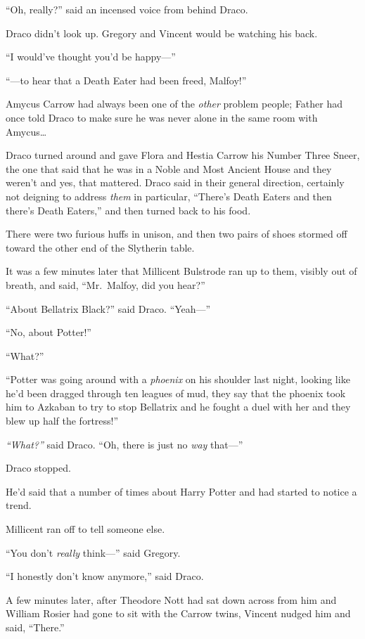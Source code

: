 ``Oh, really?'' said an incensed voice from behind Draco.

Draco didn't look up. Gregory and Vincent would be watching his back.

``I would've thought you'd be happy---''

``---to hear that a Death Eater had been freed, Malfoy!''

Amycus Carrow had always been one of the \emph{other} problem people;
Father had once told Draco to make sure he was never alone in the same
room with Amycus\ldots{}

Draco turned around and gave Flora and Hestia Carrow his Number Three
Sneer, the one that said that he was in a Noble and Most Ancient House
and they weren't and yes, that mattered. Draco said in their general
direction, certainly not deigning to address \emph{them} in particular,
``There's Death Eaters and then there's Death Eaters,'' and then turned
back to his food.

There were two furious huffs in unison, and then two pairs of shoes
stormed off toward the other end of the Slytherin table.

It was a few minutes later that Millicent Bulstrode ran up to them,
visibly out of breath, and said, ``Mr.~Malfoy, did you hear?''

``About Bellatrix Black?'' said Draco. ``Yeah---''

``No, about Potter!''

``What?''

``Potter was going around with a \emph{phoenix} on his shoulder last
night, looking like he'd been dragged through ten leagues of mud, they
say that the phoenix took him to Azkaban to try to stop Bellatrix and he
fought a duel with her and they blew up half the fortress!''

\emph{``What?''} said Draco. ``Oh, there is just no \emph{way} that---''

Draco stopped.

He'd said that a number of times about Harry Potter and had started to
notice a trend.

Millicent ran off to tell someone else.

``You don't \emph{really} think---'' said Gregory.

``I honestly don't know anymore,'' said Draco.

A few minutes later, after Theodore Nott had sat down across from him
and William Rosier had gone to sit with the Carrow twins, Vincent nudged
him and said, ``There.''

